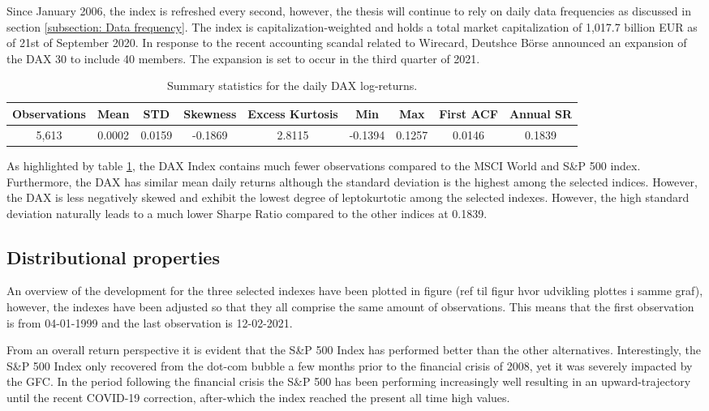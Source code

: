 Since January 2006, the index is refreshed every second, however, the thesis will continue to rely on daily data frequencies as discussed in section \ref{subsection: Data frequency}. The index is capitalization-weighted and holds a total market capitalization of 1,017.7 billion EUR as of 21st of September 2020. In response to the recent accounting scandal related to Wirecard, Deutshce Börse announced an expansion of the DAX 30 to include 40 members. The expansion is set to occur in the third quarter of 2021.

\begin{table}[H]
\caption{Summary statistics for the daily DAX log-returns.}
\centering
\begin{tabular}{c c c c c c c c c} 
\hline\hline
Observations & Mean & STD & Skewness & Excess Kurtosis & Min & Max & First ACF & Annual SR \\
\hline
5,613 & 0.0002 & 0.0159 & -0.1869 & 2.8115 & -0.1394 & 0.1257 & 0.0146 & 0.1839 \\
\hline
\end{tabular}
\label{tab:summary_stats_DAX}
\end{table}

As highlighted by table \ref{tab:summary_stats_DAX}, the DAX Index contains much fewer observations compared to the MSCI World and S\&P 500 index. Furthermore, the DAX has similar mean daily returns although the standard deviation is the highest among the selected indices. However, the DAX is less negatively skewed and exhibit the lowest degree of leptokurtotic among the selected indexes. However, the high standard deviation naturally leads to a much lower Sharpe Ratio compared to the other indices at 0.1839.

\subsection{Distributional properties}
An overview of the development for the three selected indexes have been plotted in figure (ref til figur hvor udvikling plottes i samme graf), however, the indexes have been adjusted so that they all comprise the same amount of observations. This means that the first observation is from 04-01-1999 and the last observation is 12-02-2021. 


From an overall return perspective it is evident that the S\&P 500 Index has performed better than the other alternatives. Interestingly, the S\&P 500 Index only recovered from the dot-com bubble a few months prior to the financial crisis of 2008, yet it was severely impacted by the GFC. In the period following the financial crisis the S\&P 500 has been performing increasingly well resulting in an upward-trajectory until the recent COVID-19 correction, after-which the index reached the present all time high values. 


